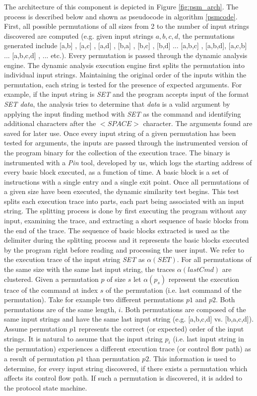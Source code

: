 \documentclass{acm_proc_article-sp}
\begin{document}
The architecture of this component is depicted in Figure \ref{fig:psm_arch}.
The process is described below and shown as pseudocode in algorithm \ref{psmcode}.
First, all possible permutations of all sizes from 2 to the number of input strings discovered are computed (e.g. given input strings $a,b,c,d$, the permutations generated include [a,b] , [a,c] , [a,d] , [b,a] , [b,c] , [b,d] ... [a,b,c] , [a,b,d], [a,c,b] ... [a,b,c,d] , ...  etc.).
Every permutation is passed through the dynamic analysis engine.
The dynamic analysis execution engine first splits the permutation into individual input strings.
Maintaining the original order of the inputs within the permutation, each string is tested for the presence of expected arguments.
For example, if the input string is \textit{SET} and the program accepts input of the format \textit{SET data}, the analysis tries to determine that \textit{data} is a valid argument by applying the input finding method with \textit{SET} as the command and identifying additional characters after the $<SPACE>$ character.
The arguments found are saved for later use.
Once every input string of a given permutation has been tested for arguments, the inputs are passed through the instrumented version of the program binary for the collection of the execution trace.
The binary is instrumented with a \textit{Pin} tool, developed by us, which logs the starting address of every basic block executed, as a function of time.
A basic block is a set of instructions with a single entry and a single exit point.
Once all permutations of a given size have been executed, the dynamic similarity test begins.
This test splits each execution trace into parts, each part being associated with an input string.
The splitting process is done by first executing the program without any input, examining the trace, and extracting a short sequence of basic blocks from the end of the trace.
The sequence of basic blocks extracted is used as the delimiter during the splitting process and it represents the basic blocks executed by the program right before reading and processing the user input.
We refer to the execution trace of the input string \textit{SET} as $\alpha(SET)$.
For all permutations of the same size with the same last input string, the traces $\alpha(lastCmd)$ are clustered.
Given a permutation $p$ of size $s$ let $\alpha(p_s)$ represent the execution trace of the command at index $s$ of the permutation (i.e. last command of the permutation).
Take for example two different permutations $p1$ and $p2$.
Both permutations are of the same length, $i$.
Both permutations are composed of the same input strings and have the same last input string (e.g. [a,b,c,d] vs. [b,a,c,d]).
Assume permutation $p1$ represents the correct (or expected) order of the input strings.
It is natural to assume that the input string $p_i$ (i.e. last input string in the permutation) experiences a different execution trace (or control flow path) as a result of permutation $p1$ than permutation $p2$.
This information is used to determine, for every input string discovered, if there exists a permutation which affects its control flow path.
If such a permutation is discovered, it is added to the protocol state machine.
\end{document}
